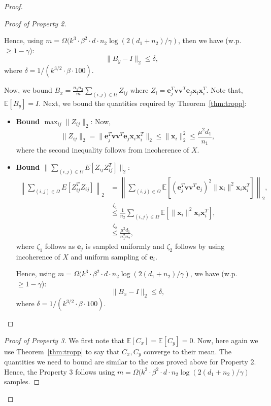 \documentclass[11pt]{article}
\newcommand{\e}{\bm{e}}
\newcommand{\tp}[1]{{#1}^{T}}
\newcommand{\E}{\mathbb{E}}
\renewcommand{\v}{\bm{v}}
\newcommand{\x}{\bm{x}}
\newcommand{\xit}{\tp{\x}_i}
\newcommand{\etj}{\tp{\e}_j}
\newcommand{\ej}{\e_j}
\begin{document}
\begin{proof}
\begin{proof}[Proof of Property 2]
\begin{itemize}
Hence, using $m=\Omega(k^3 \cdot \beta^2 \cdot d \cdot n_2 \log(2(d_1+n_2)/\gamma)$, then we have (w.p. $\geq 1-\gamma$):
$$\|B_y-I\|_2\leq \delta,$$
where $\delta=1/(k^{3/2}\cdot \beta\cdot 100)$.
\end{itemize}
Now, we bound $B_x=\frac{n_1n_2}{m}\sum_{(i,j)\in \Omega} Z_{ij}$ where $Z_i=\etj\v\v^T\ej\x_i\xit$. Note that, $\E[B_y]=I$. 
Next, we bound the quantities required by Theorem~\ref{thm:tropp}: 
\begin{itemize}
\item {\bf Bound $\max_{ij} \|Z_{ij}\|_2$}: Now, $$\|Z_{ij}\|_2=\|\etj\v\v^T\ej\x_i\xit\|_2\leq \|\x_i\|_2^2 \leq \frac{\mu^2d_1}{n_1},$$
where the second inequality follows from incoherence of $X$. 
\item {\bf Bound $\|\sum_{(i,j)\in \Omega}E[Z_{ij}Z_{ij}^T]\|_2$}: %
\begin{align}
\left\|\sum_{(i,j)\in \Omega}E[Z_{ij}^TZ_{ij}]\right\|_2&=\left\|\sum_{(i,j)\in \Omega}\E[(\etj\v\v^T\ej)^2\|\x_i\|^2\x_i\xit]\right\|_2,\nonumber\\
&\stackrel{\zeta_1}{\leq }\frac{1}{n_2}\sum_{(i,j)\in \Omega}\E[\|\x_i\|^2\x_i\xit],\nonumber\\
&\stackrel{\zeta_2}{\leq} \frac{\mu^2 d_1}{n_1^2n_2},
\end{align}
where $\zeta_1$ follows as $\e_j$ is sampled uniformly and $\zeta_2$ follows by using incoherence of $X$ and uniform sampling of $\e_i$. 

Hence, using $m=\Omega(k^3 \cdot \beta^2 \cdot d \cdot n_2 \log(2(d_1+n_2)/\gamma)$,  we have (w.p. $\geq 1-\gamma$):
$$\|B_x-I\|_2\leq \delta,$$
where $\delta=1/(k^{3/2}\cdot \beta\cdot 100)$.
\end{itemize}
\end{proof}
\begin{proof}[Proof of Property 3]
We first note that $\E[C_x]=\E[C_y]=0$. Now, here again we use Theorem~\ref{thm:tropp} to say that $C_x, C_y$  converge to their mean. The quantities we need to bound are similar to the ones proved above for Property 2. Hence, the Property 3 follows using  $m=\Omega(k^3 \cdot \beta^2 \cdot d \cdot n_2 \log(2(d_1+n_2)/\gamma)$ samples. 
\end{proof}
\end{proof}
\end{document}
